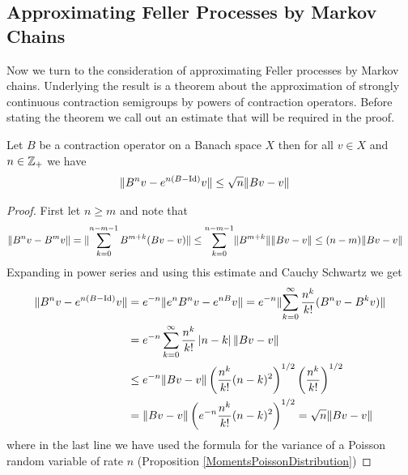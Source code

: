 \subsection{Approximating Feller Processes by Markov Chains}

Now we turn to the consideration of approximating Feller processes by Markov chains.  Underlying the result is a theorem about the approximation of strongly continuous contraction semigroups by powers of contraction operators.   Before stating the theorem we call out an estimate that will be required in the proof.

\begin{lem}\label{KurtzDiscreteTimeSemigroupConvergenceEstimate}Let $B$ be a contraction operator on a Banach space $X$ then for all $v \in X$ and $n \in \mathbb{Z}_+$ we have
\begin{align*}
\lVert B^n v - e^{n(B - \operatorname*{Id})} v \rVert &\leq \sqrt{n} \lVert Bv - v \rVert
\end{align*}
\end{lem}
\begin{proof}
First let $n \geq m$ and note that
\begin{align*}
\lVert B^n v - B^m v \rVert &= \lVert \sum_{k=0}^{n-m-1} B^{m+k} (B v - v) \rVert \leq \sum_{k=0}^{n-m-1} \lVert B^{m+k} \rVert \lVert B v - v \rVert \leq (n-m) \lVert Bv-v \rVert
\end{align*}
Expanding in power series and using this estimate and Cauchy Schwartz we get
\begin{align*}
\lVert B^n v - e^{n(B - \operatorname*{Id})} v \rVert &= e^{-n} \lVert e^n B^n v - e^{nB} v \rVert 
= e^{-n} \lVert \sum_{k=0}^\infty \frac{n^k}{k!} (B^n v - B^k v) \rVert \\
&= e^{-n} \sum_{k=0}^\infty \frac{n^k}{k!} \left \vert n-k \right \vert \lVert B v - v \rVert \\
&\leq e^{-n} \lVert B v - v \rVert \left( \frac{n^k}{k!} (n-k)^2\right)^{1/2} \left( \frac{n^k}{k!} \right)^{1/2} \\
&=\lVert B v - v \rVert \left( e^{-n} \frac{n^k}{k!} (n-k)^2\right)^{1/2} = \sqrt{n} \lVert Bv-v \rVert\\
\end{align*}
where in the last line we have used the formula for the variance of a Poisson random variable of rate $n$ (Proposition \ref{MomentsPoissonDistribution})
\end{proof}

